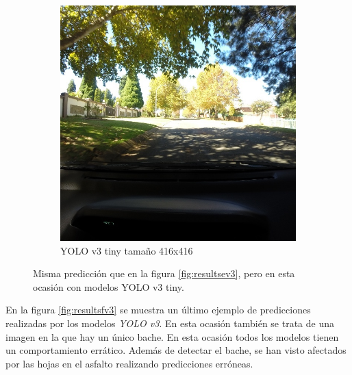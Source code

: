 \begin{figure}[H]
\begin{subfigure}[h]{0.45\linewidth}
		\includegraphics[width=\linewidth]{images/results_e_yolo_v3_tiny_416.jpg}
		\caption{YOLO v3 tiny tamaño 416x416}
	\end{subfigure}
	\caption{Misma predicción que en la figura \ref{fig:resultsev3}, pero en esta ocasión con modelos YOLO v3 tiny.}
	\label{fig:resultsev3tiny}
\end{figure}

En la figura \ref{fig:resultsfv3} se muestra un último ejemplo de predicciones realizadas por los modelos \textit{YOLO v3}. En esta ocasión también se trata de una imagen en la que hay un único bache. En esta ocasión todos los modelos tienen un comportamiento errático. Además de detectar el bache, se han visto afectados por las hojas en el asfalto realizando predicciones erróneas.

